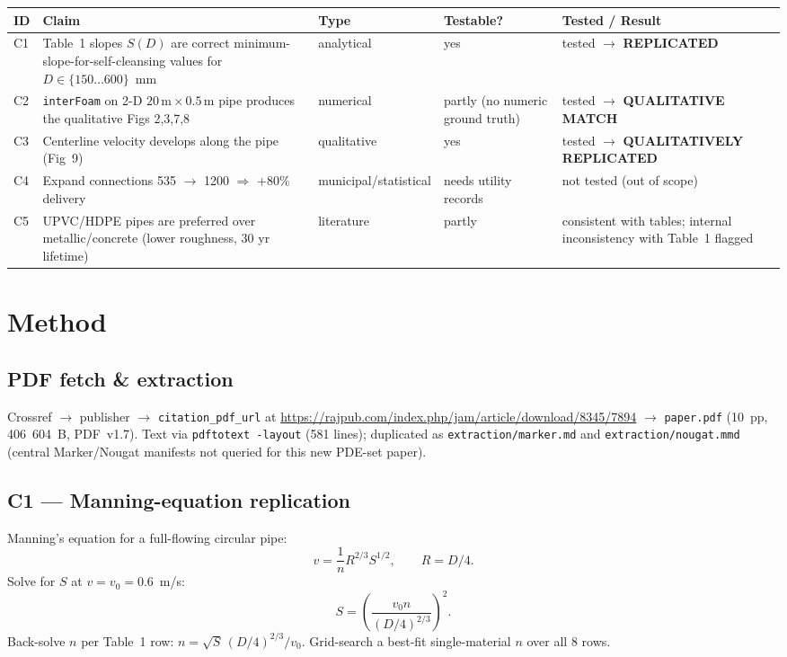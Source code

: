 \documentclass[11pt,a4paper]{article}
\begin{document}
\begin{longtable}{p{}p{}p{}p{}p{}}
\toprule
\textbf{ID} & \textbf{Claim} & \textbf{Type} & \textbf{Testable?} & \textbf{Tested / Result} \\
\midrule
C1 & Table~1 slopes $S(D)$ are correct minimum-slope-for-self-cleansing values for $D\in\{150\dots600\}$~mm & analytical & yes & tested $\to$ \textbf{REPLICATED} \\
C2 & \texttt{interFoam} on 2-D $20\,\mathrm{m}\times 0.5\,\mathrm{m}$ pipe produces the qualitative Figs 2,3,7,8 & numerical & partly (no numeric ground truth) & tested $\to$ \textbf{QUALITATIVE MATCH} \\
C3 & Centerline velocity develops along the pipe (Fig~9) & qualitative & yes & tested $\to$ \textbf{QUALITATIVELY REPLICATED} \\
C4 & Expand connections 535 $\to$ 1200 $\Rightarrow$ +80\% delivery & municipal/statistical & needs utility records & not tested (out of scope) \\
C5 & UPVC/HDPE pipes are preferred over metallic/concrete (lower roughness, 30 yr lifetime) & literature & partly & consistent with tables; internal inconsistency with Table~1 flagged \\
\bottomrule
\end{longtable}

\section{Method}

\subsection{PDF fetch \& extraction}
Crossref $\to$ publisher $\to$ \texttt{citation\_pdf\_url} at \url{https://rajpub.com/index.php/jam/article/download/8345/7894} $\to$ \texttt{paper.pdf} (10~pp, 406~604~B, PDF~v1.7). Text via \texttt{pdftotext -layout} (581 lines); duplicated as \texttt{extraction/marker.md} and \texttt{extraction/nougat.mmd} (central Marker/Nougat manifests not queried for this new PDE-set paper).

\subsection{C1 --- Manning-equation replication}
Manning's equation for a full-flowing circular pipe:
\[ v = \frac{1}{n} R^{2/3} S^{1/2}, \qquad R = D/4. \]
Solve for $S$ at $v = v_0 = 0.6$~m/s:
\[ S = \left(\frac{v_0 n}{(D/4)^{2/3}}\right)^{\!2} . \]
Back-solve $n$ per Table~1 row: $n = \sqrt{S}\,(D/4)^{2/3}/v_0$. Grid-search a best-fit
single-material $n$ over all 8 rows.
\end{document}
